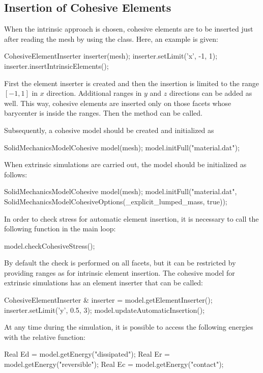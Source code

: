 \subsection{Insertion of Cohesive Elements}
When the intrinsic approach is chosen, cohesive elements are to be
inserted just after reading the mesh by using the
 class. Here, an example is given:
\begin{cpp}
  CohesiveElementInserter inserter(mesh);
  inserter.setLimit('x', -1, 1);
  inserter.insertIntrinsicElements();
\end{cpp}
First the element inserter is created and then the insertion is
limited to the range $[-1,1]$ in $x$ direction. Additional ranges in
$y$ and $z$ directions can be added as well. This way, cohesive
elements are inserted only on those facets whose barycenter is inside
the ranges. Then the method  can be called.

Subsequently, a cohesive model should be created and initialized as
\begin{cpp}
  SolidMechanicsModelCohesive model(mesh);
  model.initFull("material.dat");
\end{cpp}

When extrinsic simulations are carried out, the model should be
initialized as follows:
\begin{cpp}
  SolidMechanicsModelCohesive model(mesh);
  model.initFull("material.dat",
     SolidMechanicsModelCohesiveOptions(_explicit_lumped_mass, true));
\end{cpp}
In order to check stress for automatic element insertion, it is
necessary to call the following function in the main loop:
\begin{cpp}
  model.checkCohesiveStress();
\end{cpp}
By default the check is performed on all facets, but it can be
restricted by providing ranges as for intrinsic element insertion. The
cohesive model for extrinsic simulations has an element inserter that
can be called:
\begin{cpp}
  CohesiveElementInserter & inserter = model.getElementInserter();
  inserter.setLimit('y', 0.5, 3);
  model.updateAutomaticInsertion();
\end{cpp}

At any time during the simulation, it is possible to access the
following energies with the relative function:
\begin{cpp}
  Real Ed = model.getEnergy("dissipated");
  Real Er = model.getEnergy("reversible");
  Real Ec = model.getEnergy("contact");
\end{cpp}
